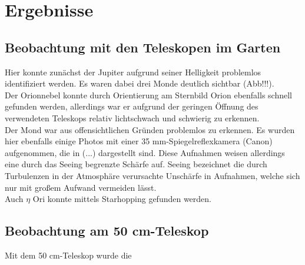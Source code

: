 \section{Ergebnisse}
\subsection{Beobachtung mit den Teleskopen im Garten}
Hier konnte zunächst der Jupiter aufgrund seiner Helligkeit problemlos identifiziert werden. Es waren dabei drei Monde deutlich sichtbar (Abb!!!). \\
Der Orionnebel konnte durch Orientierung am Sternbild Orion ebenfalls schnell gefunden werden, allerdings war er aufgrund der geringen Öffnung des verwendeten Teleskops relativ lichtschwach und schwierig zu erkennen. \\
Der Mond war aus offensichtlichen Gründen problemlos zu erkennen. Es wurden hier ebenfalls einige Photos mit einer 35 mm-Spiegelreflexkamera (Canon) aufgenommen, die in (...) dargestellt sind. Diese Aufnahmen weisen allerdings eine durch das Seeing begrenzte Schärfe auf. Seeing bezeichnet die durch Turbulenzen in der Atmosphäre verursachte Unschärfe in Aufnahmen, welche sich nur mit großem Aufwand vermeiden lässt. \\
Auch $\eta$ Ori konnte mittels Starhopping gefunden werden.

\subsection{Beobachtung am 50 cm-Teleskop} 
Mit dem 50 cm-Teleskop wurde die 
